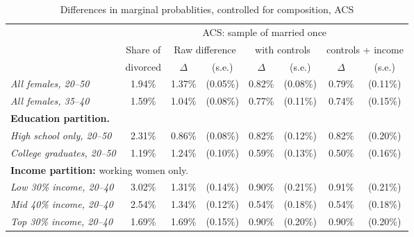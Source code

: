 \documentclass[12pt,letter]{article}
\begin{document}
\begin{table}
\begin{center}
\begin{tabular}{|l|c||c|c|c|c|c|c|}\cline{2-8}
\multicolumn{1}{c|}{} & \multicolumn{7}{c|}{ACS: sample of married once}\\\cline{2-8}
\multicolumn{1}{c|}{} & \small Share of &\multicolumn{2}{c|}{\small Raw difference} & \multicolumn{2}{c|}{\small with controls} & \multicolumn{2}{c|}{\small controls + income} \\ \cline{3-8}
\multicolumn{1}{c|}{} & \small divorced & $\Delta$ & (s.e.) & $\Delta$ & (s.e.) & $\Delta$ & (s.e.) \\  \hline
\textit{All females, 20--50} & 1.94\% &  1.37\% &  (0.05\%) &  0.82\% &  (0.08\%) &  0.79\%  &  (0.11\%) \\
\textit{All females, 35--40} &   1.59\% &  1.04\% &  (0.08\%) &   0.77\% &  (0.11\%)  &  0.74\%   &  (0.15\%) \\\hline\hline
\multicolumn{8}{|p{0.9\linewidth}|}{\footnotesize \textbf{Education partition.}}\\\hline
\textit{High school only, 20--50} & 2.31\% &  0.86\% &  (0.08\%) &   0.82\% &  (0.12\%)  &  0.82\%  &   (0.20\%) \\
\textit{College graduates, 20--50} & 1.19\% &  1.24\% & (0.10\%) &   0.59\% &   (0.13\%)  &  0.50\% &    (0.16\%) \\\hline\hline
\multicolumn{8}{|p{0.9\linewidth}|}{\footnotesize \textbf{Income partition:} working women only.}\\\hline
\textit{Low 30\% income, 20--40} &  3.02\% &  1.31\% &  (0.14\%) &   0.90\% &  (0.21\%) &   0.91\%  &   (0.21\%) \\
\textit{Mid 40\% income, 20--40} &  2.54\% &  1.34\% &  (0.12\%) &   0.54\%  & (0.18\%) &   0.54\% &    (0.18\%) \\
\textit{Top 30\% income, 20--40} & 1.69\% &  1.69\% &   (0.15\%) &   0.90\%  & (0.20\%) &   0.90\% &    (0.20\%) \\
\hline
\end{tabular}
\caption{Differences in marginal probablities, controlled for composition, ACS\label{diff-contr-marginal}}
\end{center}
\end{table}
\end{document}
